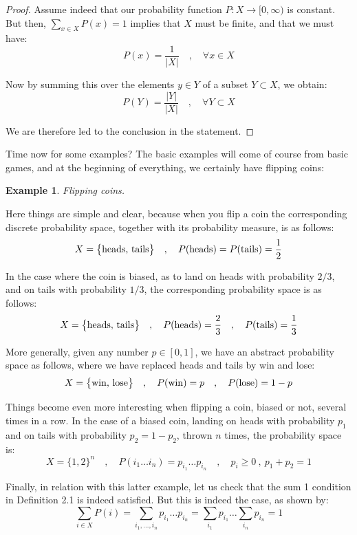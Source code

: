 \documentclass[12pt]{amsbook}
\newtheorem{example}[theorem]{Example}
\begin{document}
\begin{proof}
Assume indeed that our probability function $P:X\to[0,\infty)$ is constant. But then, $\sum_{x\in X}P(x)=1$ implies that $X$ must be finite, and that we must have:
$$P(x)=\frac{1}{|X|}\quad,\quad\forall x\in X$$

Now by summing this over the elements $y\in Y$ of a subset $Y\subset X$, we obtain:
$$P(Y)=\frac{|Y|}{|X|}\quad,\quad\forall Y\subset X$$

We are therefore led to the conclusion in the statement.
\end{proof}

Time now for some examples? The basic examples will come of course from basic games, and at the beginning of everything, we certainly have flipping coins:

\begin{example}
Flipping coins.
\end{example}

Here things are simple and clear, because when you flip a coin the corresponding discrete probability space, together with its probability measure, is as follows:
$$X=\big\{{\rm heads},\,{\rm tails}\big\}\quad,\quad P({\rm heads})=P({\rm tails})=\frac{1}{2}$$

In the case where the coin is biased, as to land on heads with probability $2/3$, and on tails with probability $1/3$, the corresponding probability space is as follows:
$$X=\big\{{\rm heads},\,{\rm tails}\big\}\quad,\quad P({\rm heads})=\frac{2}{3}\quad,\quad P({\rm tails})=\frac{1}{3}$$

More generally, given any number $p\in[0,1]$, we have an abstract probability space as follows, where we have replaced heads and tails by win and lose:
$$X=\big\{{\rm win},\,{\rm lose}\big\}\quad,\quad P({\rm win})=p\quad,\quad P({\rm lose})=1-p$$

Things become even more interesting when flipping a coin, biased or not, several times in a row. In the case of a biased coin, landing on heads with probability $p_1$ and on tails with probability $p_2=1-p_2$, thrown $n$ times, the probability space is:
$$X=\big\{1,2\}^n\quad,\quad P(i_1\ldots i_n)=p_{i_1}\ldots p_{i_n}\quad,\quad p_i\geq0\ ,\ p_1+p_2=1$$

Finally, in relation with this latter example, let us check that the sum 1 condition in Definition 2.1 is indeed satisfied. But this is indeed the case, as shown by:
$$\sum_{i\in X}P(i)
=\sum_{i_1,\ldots,i_n}p_{i_1}\ldots p_{i_n}
=\sum_{i_1}p_{i_1}\ldots\sum_{i_n}p_{i_n}
=1$$
\end{document}

